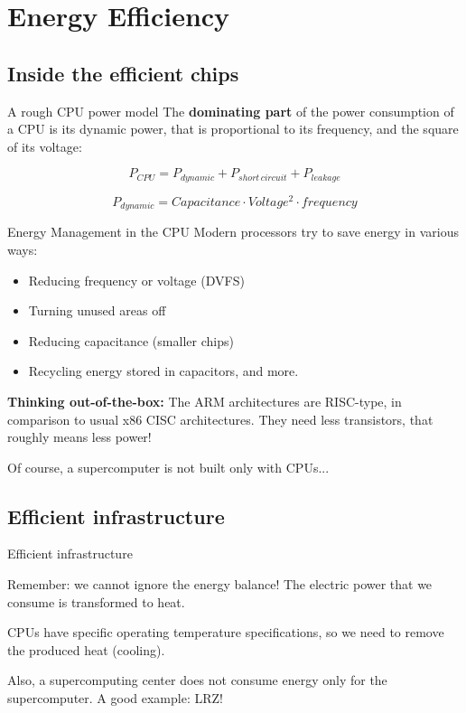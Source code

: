 \documentclass[10pt, compress]{beamer}
\begin{document}
\section{Energy Efficiency}

\subsection{Inside the efficient chips}


\begin{frame}[fragile]{A rough CPU power model}
The \textbf{dominating part} of the power consumption of a CPU is its dynamic power, that is \alert{proportional to its frequency}, and the square of its voltage:

\begin{equation}
 P_{CPU} = P_{dynamic} + P_{short\,circuit} + P_{leakage}
\end{equation}

\begin{equation}
 P_{dynamic} = Capacitance \cdot Voltage^2 \cdot frequency
\end{equation}
\end{frame}


\begin{frame}[fragile]{Energy Management in the CPU}
Modern processors try to save energy in various ways:
\begin{itemize}
\item \alert{Reducing frequency or voltage (DVFS)}
\item Turning unused areas off
\item Reducing capacitance (smaller chips)
\item Recycling energy stored in capacitors, and more.
\end{itemize}

\pause

\textbf{Thinking out-of-the-box:} The ARM architectures are RISC-type, in comparison to
usual x86 CISC architectures. They need less transistors, that roughly means
less power!

\pause

Of course, a supercomputer is not built only with CPUs...
\end{frame}


\subsection{Efficient infrastructure}

\begin{frame}[fragile]{Efficient infrastructure}

Remember: we cannot ignore the energy balance! The electric power that we consume
is transformed to heat.

CPUs have specific operating temperature specifications, so \alert{we need to remove the
produced heat} (cooling).

Also, a supercomputing center does not consume energy only for the supercomputer. A good example: LRZ!
\end{frame}
\end{document}
